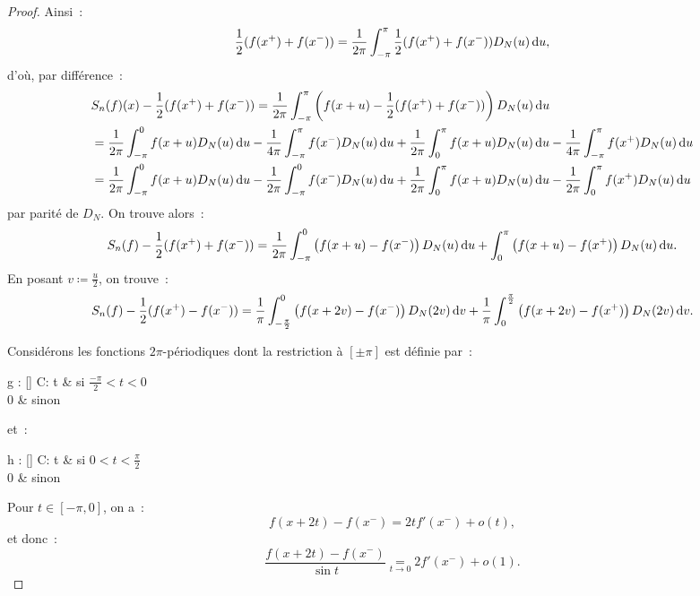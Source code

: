 \documentclass{report}
\theoremstyle{definition}
\theoremstyle{remark}
\numberwithin{equation}{section}
\newcommand{\C}{\mathbb C}
\begin{document}
\begin{proof}
			Ainsi~:
			\begin{equation}
				\frac 12(f(x^+) + f(x^-)) = \frac 1{2\pi}\int_{-\pi}^\pi\frac 12(f(x^+) + f(x^-))D_N(u)\dif u,
			\end{equation}
			d'où, par différence~:
			\begin{align}
				&S_n(f)(x) - \frac 12(f(x^+) + f(x^-)) = \frac 1{2\pi}\int_{-\pi}^\pi\left(f(x+u) - \frac 12(f(x^+)+f(x^-))\right)D_N(u)\dif u \\
				&= \frac 1{2\pi}\int_{-\pi}^0f(x+u)D_N(u)\dif u - \frac 1{4\pi}\int_{-\pi}^\pi f(x^-)D_N(u)\dif u + \frac 1{2\pi}\int_0^\pi f(x+u)D_N(u)\dif u - \frac 1{4\pi}\int_{-\pi}^\pi f(x^+)D_N(u)\dif u \\
				&= \frac 1{2\pi}\int_{-\pi}^0f(x+u)D_N(u)\dif u - \frac 1{2\pi}\int_{-\pi}^0 f(x^-)D_N(u)\dif u + \frac 1{2\pi}\int_0^\pi f(x+u)D_N(u)\dif u - \frac 1{2\pi}\int_0^\pi f(x^+)D_N(u)\dif u
			\end{align}
			par parité de $D_N$. On trouve alors~:
			\begin{equation}
				S_n(f) - \frac 12(f(x^+)+f(x^-)) = \frac 1{2\pi}\int_{-\pi}^0\left(f(x+u) - f(x^-)\right)D_N(u)\dif u + \int_0^\pi\left(f(x+u) - f(x^+)\right)D_N(u)\dif u.
			\end{equation}
			En posant $v \coloneqq \frac u2$, on trouve~:
			\begin{equation}
				S_n(f) - \frac 12(f(x^+) - f(x^-)) = \frac 1\pi\int_{-\frac \pi2}^0\left(f(x+2v)-f(x^-)\right)D_N(2v)\dif v + \frac 1\pi\int_0^{\frac \pi2}\left(f(x+2v)-f(x^+)\right)D_N(2v)\dif v.
			\end{equation}

			Considérons les fonctions $2\pi$-périodiques dont la restriction à $[\pm \pi]$ est définie par~:
			\begin{subnumcases}
				{g : [\pm\pi] \to \C : t \mapsto}
					 & si $\frac {-\pi}2 < t < 0$ \\
					0 & sinon
			\end{subnumcases}
			et~:
			\begin{subnumcases}
				{h : [\pm\pi] \to \C : t \mapsto}
					 & si $0 < t < \frac \pi2$ \\
					0 & sinon
			\end{subnumcases}

			Pour $t \in [-\pi, 0]$, on a~:
			\begin{equation}
				f(x+2t) - f(x^-) = 2tf'(x^-) + o(t),
			\end{equation}
			et donc~:
			\begin{equation}
				\frac {f(x+2t) - f(x^-)}{\sin t} \underset {t \to 0}= 2f'(x^-) + o(1).
			\end{equation}


\end{proof}
\end{document}
